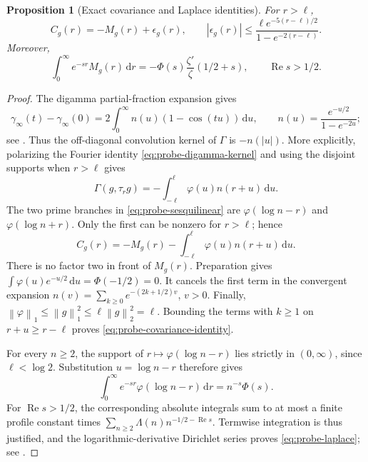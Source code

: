 \documentclass[11pt]{article}
\numberwithin{equation}{section}
\newtheorem{proposition}[theorem]{Proposition}
\theoremstyle{definition}
\theoremstyle{remark}
\newcommand{\Rea}{\operatorname{Re}}
\newcommand{\norm}[1]{\left\lVert #1\right\rVert}
\newcommand{\dd}{\,\mathrm d}
\begin{document}
\begin{proposition}[Exact covariance and Laplace identities]
\label{prop:probe-identities}
For \(r>\ell\),
\begin{equation}\label{eq:probe-covariance-identity}
C_g(r)=-M_g(r)+\epsilon_g(r),\qquad
|\epsilon_g(r)|\le
\frac{\ell e^{-5(r-\ell)/2}}{1-e^{-2(r-\ell)}}.
\end{equation}
Moreover,
\begin{equation}\label{eq:probe-laplace}
\int_0^\infty e^{-sr}M_g(r)\dd r
=-\Phi(s)\frac{\zeta'}{\zeta}(1/2+s),
\qquad \Rea s>1/2.
\end{equation}
\end{proposition}
\begin{proof}
The digamma partial-fraction expansion gives
\begin{equation}\label{eq:probe-digamma-kernel}
\gamma_\infty(t)-\gamma_\infty(0)
=2\int_0^\infty n(u)(1-\cos(tu))\dd u,
\qquad n(u)=\frac{e^{-u/2}}{1-e^{-2u}};
\end{equation}
see \cite[\S5.7, equation 5.7.6]{DLMF}.
Thus the off-diagonal convolution kernel of \(\Gamma\) is
\(-n(|u|)\). More explicitly, polarizing the Fourier identity
\eqref{eq:probe-digamma-kernel} and using the disjoint supports when
\(r>\ell\) gives
\[
\Gamma(g,\tau_rg)
=-\int_{-\ell}^{\ell}\varphi(u)n(r+u)\dd u.
\]
The two prime branches in \eqref{eq:probe-sesquilinear} are
\(\varphi(\log n-r)\) and \(\varphi(\log n+r)\).
Only the first can be nonzero for \(r>\ell\); hence
\begin{equation}\label{eq:probe-exact-remainder}
C_g(r)=-M_g(r)
-\int_{-\ell}^{\ell}\varphi(u)n(r+u)\dd u.
\end{equation}
There is no factor two in front of \(M_g(r)\).
Preparation gives
\(\int\varphi(u)e^{-u/2}\dd u=\Phi(-1/2)=0\).
It cancels the first term in the convergent expansion
\(n(v)=\sum_{k\ge0}e^{-(2k+1/2)v}\), \(v>0\).
Finally,
\(\norm\varphi_1\le\norm g_1^2\le\ell\norm g_2^2=\ell\).
Bounding the terms with \(k\ge1\) on \(r+u\ge r-\ell\) proves
\eqref{eq:probe-covariance-identity}.

For every \(n\ge2\), the support of
\(r\mapsto\varphi(\log n-r)\) lies strictly in \((0,\infty)\),
since \(\ell<\log2\). Substitution \(u=\log n-r\) therefore gives
\[
\int_0^\infty e^{-sr}\varphi(\log n-r)\dd r
=n^{-s}\Phi(s).
\]
For \(\Rea s>1/2\), the corresponding absolute integrals sum to at
most a finite profile constant times
\(\sum_{n\ge2}\Lambda(n)n^{-1/2-\Rea s}\).
Termwise integration is thus justified, and the logarithmic-derivative
Dirichlet series proves \eqref{eq:probe-laplace}; see
\cite[\S27.4, equation 27.4.12]{DLMF}.
\end{proof}
\end{document}
